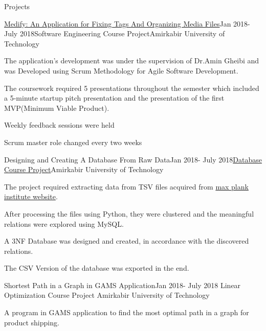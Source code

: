 \documentclass{resume} %
\begin{document}
	
	\begin{rSection}{Projects}
		
		\begin{rSubsection}{\href{https://github.com/pouyaaghahoseini/Medify}{Medify: An Application for Fixing Tags And Organizing Media Files}}{Jan 2018- July 2018}{Software Engineering Course Project}{Amirkabir University of Technology}
			
			\item The application's development was under the supervision of Dr.Amin Gheibi and was Developed using Scrum Methodology for Agile Software Development.
			\item The coursework required 5 presentations throughout the semester which included a 5-minute startup pitch presentation and the presentation of the first MVP(Minimum Viable Product).
			\item Weekly feedback sessions were held
			\item Scrum master role changed every two weeks	
		\end{rSubsection}
		
		\begin{rSubsection}{Designing and Creating A Database From Raw Data}{Jan 2018- July 2018}{\href{https://github.com/pouyaaghahoseini/Database-Course}{Database Course Project}}{Amirkabir University of Technology}
			\item The project required extracting data from TSV files acquired from \href{https://www.mpi-inf.mpg.de/departments/databases-and-information-systems/research/yago-naga/yago/downloads/}{max plank institute website}.
			\item After processing the files using Python, they were clustered and the meaningful relations were explored using MySQL.
			\item A 3NF Database was designed and created, in accordance with the discovered relations.
			\item The CSV Version of the database was exported in the end. 
			
		\end{rSubsection}	
		
		
		\begin{rSubsection}{Shortest Path in a Graph in GAMS Application}{Jan 2018- July 2018}{
				Linear Optimization Course Project }{Amirkabir University of Technology}
			\item A program in GAMS application to find the most optimal path in a graph for product shipping.
			

\end{rSubsection}
\end{rSection}
\end{document}

